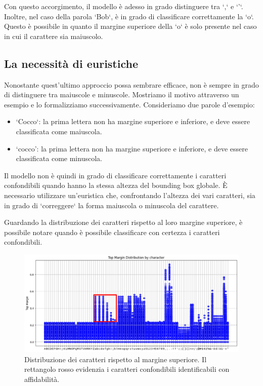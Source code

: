 Con questo accorgimento, il modello è adesso in grado distinguere tra `,` e `'`. Inoltre, nel caso della parola `Bob`, è in grado di classificare correttamente la `o`. Questo è possibile in quanto il margine superiore della `o` è solo presente nel caso in cui il carattere sia maiuscolo.

\subsection{La necessità di euristiche}

Nonostante quest'ultimo approccio possa sembrare efficace, non è sempre in grado di distinguere tra maiuscole e minuscole.
Mostriamo il motivo attraverso un esempio e lo formalizziamo successivamente.
Consideriamo due parole d'esempio:
\begin{itemize}
	\item `Cocco`: la prima lettera non ha margine superiore e inferiore, e deve essere classificata come maiuscola.
	\item `cocco': la prima lettera non ha margine superiore e inferiore, e deve essere classificata come minuscola.
\end{itemize}

Il modello non è quindi in grado di classificare correttamente i caratteri confondibili quando hanno la stessa altezza del bounding box globale.
È necessario utilizzare un'euristica che, confrontando l'altezza dei vari caratteri, sia in grado di `correggere` la forma maiuscola o minuscola del carattere.

Guardando la distribuzione dei caratteri rispetto al loro margine superiore, è possibile notare quando è possibile classificare con certezza i caratteri confondibili.

\begin{figure}[H]
	\centering
	\includegraphics[width=1\textwidth]{images/top_margin_distribution_highlight.png}
	\caption{Distribuzione dei caratteri rispetto al margine superiore. Il rettangolo rosso evidenzia i caratteri confondibili identificabili con affidabilità.}
	\label{fig:top_margin_distribution_highlight.png}
\end{figure}

